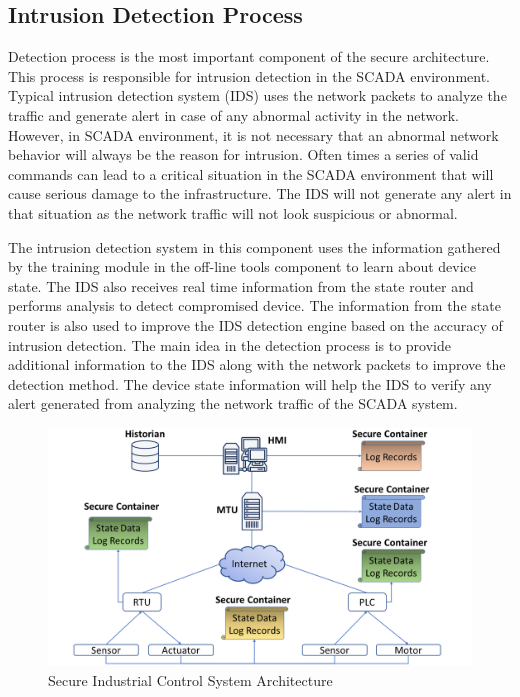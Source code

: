 \documentclass[conference]{IEEEtran}
\begin{document}
\subsection{Intrusion Detection Process}
Detection process is the most important component of the secure architecture. This process is responsible for intrusion detection in the SCADA environment. Typical intrusion detection system (IDS) uses the network packets to analyze the traffic and generate alert in case of any abnormal activity in the network. However, in SCADA environment, it is not necessary that an abnormal network behavior will always be the reason for intrusion. Often times a series of valid commands can lead to a critical situation in the SCADA environment that will cause serious damage to the infrastructure. The IDS will not generate any alert in that situation as the network traffic will not look suspicious or abnormal.
\par The intrusion detection system in this component uses the information gathered by the training module in the off-line tools component to learn about device state. The IDS also receives real time information from the state router and performs analysis to detect compromised device. The information from the state router is also used to improve the IDS detection engine based on the accuracy of intrusion detection. The main idea in the detection process is to provide additional information to the IDS along with the network packets to improve the detection method. The device state information will help the IDS to verify any alert generated from analyzing the network traffic of the SCADA system.  
\begin{figure}[htbp]
\centering
\centerline{\includegraphics [width=.5\textwidth]{sec_arch.png}}
\caption{Secure Industrial Control System Architecture}
\label{SICSA}
%
\end{figure}
\end{document}
